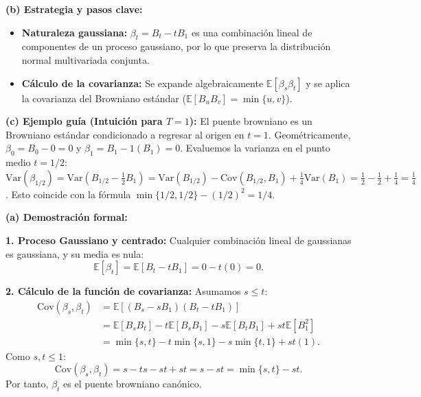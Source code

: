 \documentclass[11pt, letterpaper]{article}
\begin{document}
\vspace{5mm}

\begin{solucion}
    \textbf{(b) Estrategia y pasos clave:}
    \begin{itemize}
        \item[(i)] \textbf{Naturaleza gaussiana:} $\beta_t = B_t - tB_1$ es una combinación lineal de componentes de un proceso gaussiano, por lo que preserva la distribución normal multivariada conjunta.
        \item[(ii)] \textbf{Cálculo de la covarianza:} Se expande algebraicamente $\mathbb{E}[\beta_s \beta_t]$ y se aplica la covarianza del Browniano estándar ($\mathbb{E}[B_u B_v]=\min\{u, v\}$).
    \end{itemize}

    \vspace{3mm}
    \textbf{(c) Ejemplo guía (Intuición para $T=1$):}
    El puente browniano es un Browniano estándar condicionado a regresar al origen en $t=1$. Geométricamente, $\beta_0 = B_0 - 0 = 0$ y $\beta_1 = B_1 - 1(B_1) = 0$. 
    Evaluemos la varianza en el punto medio $t = 1/2$:
    $\text{Var}(\beta_{1/2}) = \text{Var}(B_{1/2} - \frac{1}{2}B_1) = \text{Var}(B_{1/2}) - \text{Cov}(B_{1/2}, B_1) + \frac{1}{4}\text{Var}(B_1) = \frac{1}{2} - \frac{1}{2} + \frac{1}{4} = \frac{1}{4}$.
    Esto coincide con la fórmula $\min\{1/2, 1/2\} - (1/2)^2 = 1/4$.

    \vspace{3mm}
    \textbf{(a) Demostración formal:}

    \textbf{1. Proceso Gaussiano y centrado:}
    Cualquier combinación lineal de gaussianas es gaussiana, y su media es nula:
    \[ \mathbb{E}[\beta_t] = \mathbb{E}[B_t - tB_1] = 0 - t(0) = 0. \]

    \textbf{2. Cálculo de la función de covarianza:}
    Asumamos $s \le t$:
    \begin{align*}
        \text{Cov}(\beta_s, \beta_t) &= \mathbb{E}[(B_s - sB_1)(B_t - tB_1)] \\
        &= \mathbb{E}[B_s B_t] - t\mathbb{E}[B_s B_1] - s\mathbb{E}[B_t B_1] + st\mathbb{E}[B_1^2] \\
        &= \min\{s, t\} - t\min\{s, 1\} - s\min\{t, 1\} + st(1).
    \end{align*}
    Como $s, t \le 1$:
    \[ \text{Cov}(\beta_s, \beta_t) = s - ts - st + st = s - st = \min\{s, t\} - st. \]
    Por tanto, $\beta_t$ es el puente browniano canónico.
\end{solucion}
\end{document}
